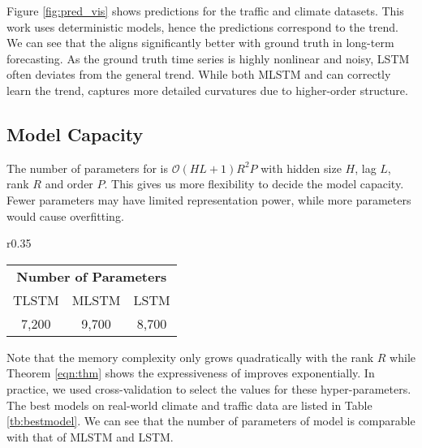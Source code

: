 Figure \ref{fig:pred_vis} shows predictions for the traffic and climate datasets. This work uses deterministic models, hence the predictions correspond to the trend.
%
We can see that the \tlstm{} aligns significantly better with ground truth in long-term forecasting.
%
As the ground truth time series is highly nonlinear and noisy, LSTM often deviates from the general trend.
%
While both MLSTM and \tlstm{} can correctly learn the trend, \tlstm{} captures more detailed curvatures due to higher-order structure.


%
%



\subsection{Model Capacity} 
The number of parameters for \trnn{} is $\mathcal{O} (HL+1)R^2P$ with hidden size $H$, lag $L$, rank $R$ and order $P$. This gives us more flexibility to decide the model capacity. Fewer parameters may have limited representation power, while more parameters would cause overfitting. 
%
\begin{wraptable}{r}{0.35\linewidth}
\caption{Best performing model size on traffic and climate data.}
\begin{tabular}{ccc}
\multicolumn{3}{c}{\bf  Number of Parameters}\\
TLSTM & MLSTM & LSTM \\
\midrule
7,200  & 9,700  & 8,700
\end{tabular}
\label{tb:bestmodel}
\end{wraptable}
%
Note that the memory complexity only grows quadratically with the rank $R$ while Theorem \ref{eqn:thm} shows the expressiveness of \trnn{} improves exponentially.
In practice, we used cross-validation to select the values for these hyper-parameters. The best models on real-world climate and traffic data are listed in Table \ref{tb:bestmodel}. We can see that the number of parameters of \tlstm{} model is comparable with that of MLSTM and LSTM. 

